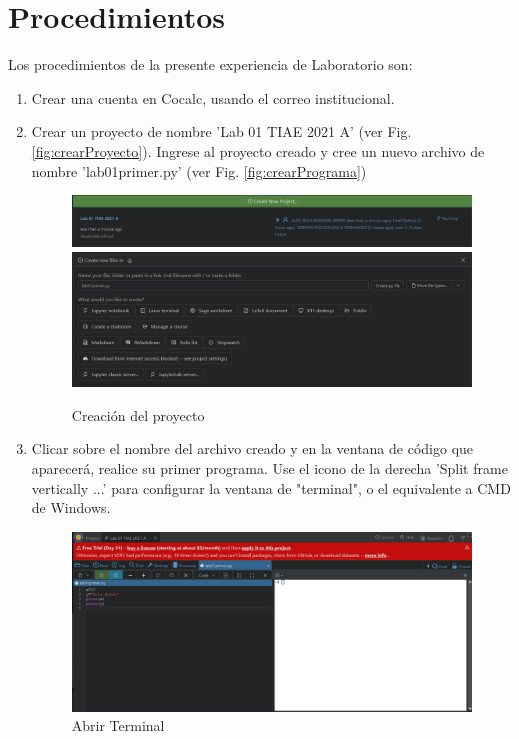\documentclass[12pt,oneside,spanish]{article}
\begin{document}
\section{Procedimientos}
Los procedimientos de la presente experiencia de Laboratorio son:
\begin{enumerate}
\item Crear una cuenta en Cocalc, usando el correo institucional.
\item Crear un proyecto de nombre 'Lab 01 TIAE 2021 A' (ver Fig. \ref{fig:crearProyecto}). Ingrese al proyecto creado y cree un nuevo archivo de nombre 'lab01primer.py' (ver Fig. \ref{fig:crearPrograma})

\begin{figure}[h]
    \centering
    \includegraphics[scale=0.4]{Codigo/2.Proyecto.png}
    \includegraphics[scale=0.4]{Codigo/2.archivo.png}
    \caption{Creación del proyecto}
\end{figure}

\item Clicar sobre el nombre del archivo creado y en la ventana de código que aparecerá, realice su primer programa. Use el icono de la derecha 'Split frame vertically ...' para configurar la ventana de "terminal", o el equivalente a CMD de Windows.

\begin{figure}[h]
    \centering
    \includegraphics[scale=0.4]{Codigo/3.terminal.png}
    \caption{Abrir Terminal}
\end{figure}


\end{enumerate}
\end{document}
